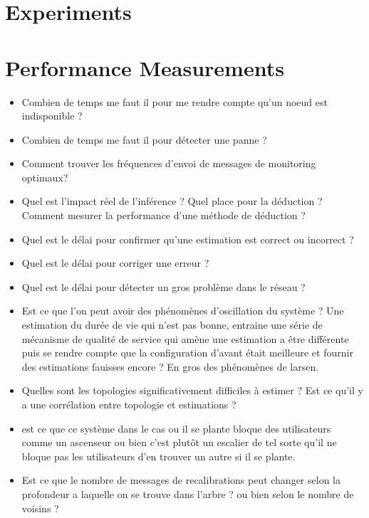 \section{Experiments} %
\label{sec:estimators_experiments}

\lipsum


\section{Performance Measurements} %
\label{sec:performance_measurements}

\begin{itemize}
	\item Combien de temps me faut il pour me rendre compte qu'un noeud est indisponible ?
	\item Combien de temps me faut il pour détecter une panne ?
	\item Comment trouver les fréquences d'envoi de messages de monitoring optimaux?
	\item Quel est l'impact réel de l'inférence ? Quel place pour la déduction ? Comment mesurer la performance d'une méthode de déduction ?
	\item Quel est le délai pour confirmer qu'une estimation est correct ou incorrect ?
	\item Quel est le délai pour corriger une erreur ?
	\item Quel est le délai pour détecter un gros problème dans le réseau ?
	\item Est ce que l'on peut avoir des phénomènes d'oscillation du système ? Une estimation
	du durée de vie qui n'est pas bonne, entraine une série de mécanisme de qualité de service qui amène une estimation a être différente puis se rendre compte que la configuration d'avant était meilleure et fournir des estimations fauisses encore ? En gros des phénomènes de larsen.
	\item Quelles sont les topologies significativement difficiles à estimer ? Est ce qu'il y a une corrélation entre topologie et estimations ?

	\item est ce que ce système dans le cas ou il se plante bloque des utilisateurs comme 
	un ascenseur ou bien c'est plutôt un escalier de tel sorte qu'il ne bloque pas les utilisateurs d'en trouver un autre si il se plante.

	\item Est ce que le nombre de messages de recalibrations peut changer selon la profondeur a laquelle on se trouve dans l'arbre ? ou bien selon le nombre de voisins ?


\end{itemize}
